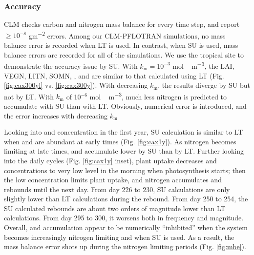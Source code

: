 \documentclass[gmd, manuscript]{copernicus}
\begin{document}
\subsubsection{Accuracy}
CLM checks carbon and nitrogen mass balance for every time step, and report
 $\geq 10^{-8}$ \unit{gm^{-2}} errors. Among our CLM-PFLOTRAN
simulations, no mass balance error is recorded when LT is used. In contrast,
when SU is used, mass balance errors are recorded for all of the simulations. 
We use the tropical site to demonstrate the accuracy issue by SU.
With $k_\text{m} =
10^{-3}$ \unit{mol\,m^{-3}}, the LAI, VEGN, LITN, SOMN, , and
 are similar to that calculated using LT (Fig.
\ref{fig:cax300yl} vs. \ref{fig:cax300y}). With decreasing $k_\text{m}$, the
results diverge by SU but not by LT. With $k_\text{m}$ of 10$^{-6}$
\unit{mol\,m^{-3}}, much less nitrogen is predicted to accumulate with SU than
with LT. Obviously, numerical error is introduced, and the
error increases with decreasing $k_\text{m}$ 
  
Looking into  and  concentration in the first year, SU
calculation is similar to LT when  and  are abundant
at early times (Fig.
\ref{fig:cax1y}). As nitrogen becomes limiting at late times, 
 and  accumulate lower by SU
than by LT. Further looking into the daily cycles (Fig. \ref{fig:cax1y}
inset), plant uptake decreases  and  concentrations
to very low level in the morning when photosynthesis starts; then the low
concentration limits plant uptake, and nitrogen accumulates and rebounds until
the next day. From day 226 to 230,
SU calculations are only slightly lower than LT calculations during the
rebound. From day 250 to 254, the SU calculated rebounds are about two orders
of magnitude lower than LT calculations. From day 295 to 300, it worsens both in frequency and magnitude.
Overall,  and  accumulation appear to be
numerically ``inhibited'' when the system becomes increasingly nitrogen limiting
and when SU is used. As a result, the mass balance error shots up during the
nitrogen limiting periods (Fig. \ref{fig:mbe}). 
\end{document}
